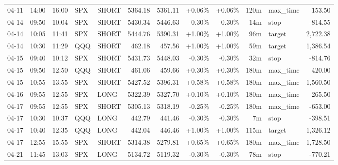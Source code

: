 \documentclass[11pt,a4paper]{article}
\begin{document}
\begin{center}
\begin{longtable}{>{\color{txtmain}}l l l l l r r r r r >{\color{txtmain}}l r}
04-11 & 14:00 & 16:00 & SPX & SHORT & 5364.18 & 5361.11 & \textcolor{wingreen}{+0.06\%} & \textcolor{wingreen}{+0.06\%} & 120m & max\_time & \textcolor{wingreen}{153.50} \\
04-14 & 09:50 & 10:04 & SPX & SHORT & 5430.34 & 5446.63 & \textcolor{lossred}{-0.30\%} & \textcolor{lossred}{-0.30\%} & 14m & stop & \textcolor{lossred}{-814.55} \\
04-14 & 10:05 & 11:41 & SPX & SHORT & 5444.76 & 5390.31 & \textcolor{wingreen}{+1.00\%} & \textcolor{wingreen}{+1.00\%} & 96m & target & \textcolor{wingreen}{2,722.38} \\
04-14 & 10:30 & 11:29 & QQQ & SHORT & 462.18 & 457.56 & \textcolor{wingreen}{+1.00\%} & \textcolor{wingreen}{+1.00\%} & 59m & target & \textcolor{wingreen}{1,386.54} \\
04-15 & 09:40 & 10:12 & SPX & SHORT & 5431.73 & 5448.03 & \textcolor{lossred}{-0.30\%} & \textcolor{lossred}{-0.30\%} & 32m & stop & \textcolor{lossred}{-814.76} \\
04-15 & 09:50 & 12:50 & QQQ & SHORT & 461.06 & 459.66 & \textcolor{wingreen}{+0.30\%} & \textcolor{wingreen}{+0.30\%} & 180m & max\_time & \textcolor{wingreen}{420.00} \\
04-15 & 10:55 & 13:55 & SPX & SHORT & 5427.52 & 5396.31 & \textcolor{wingreen}{+0.58\%} & \textcolor{wingreen}{+0.58\%} & 180m & max\_time & \textcolor{wingreen}{1,560.50} \\
04-16 & 09:55 & 12:55 & SPX & LONG & 5322.39 & 5327.70 & \textcolor{wingreen}{+0.10\%} & \textcolor{wingreen}{+0.10\%} & 180m & max\_time & \textcolor{wingreen}{265.50} \\
04-17 & 09:55 & 12:55 & SPX & SHORT & 5305.13 & 5318.19 & \textcolor{lossred}{-0.25\%} & \textcolor{lossred}{-0.25\%} & 180m & max\_time & \textcolor{lossred}{-653.00} \\
04-17 & 10:30 & 10:37 & QQQ & LONG & 442.79 & 441.46 & \textcolor{lossred}{-0.30\%} & \textcolor{lossred}{-0.30\%} & 7m & stop & \textcolor{lossred}{-398.51} \\
04-17 & 10:40 & 12:35 & QQQ & LONG & 442.04 & 446.46 & \textcolor{wingreen}{+1.00\%} & \textcolor{wingreen}{+1.00\%} & 115m & target & \textcolor{wingreen}{1,326.12} \\
04-17 & 12:55 & 15:55 & SPX & SHORT & 5314.38 & 5279.81 & \textcolor{wingreen}{+0.65\%} & \textcolor{wingreen}{+0.65\%} & 180m & max\_time & \textcolor{wingreen}{1,728.50} \\
04-21 & 11:45 & 13:03 & SPX & LONG & 5134.72 & 5119.32 & \textcolor{lossred}{-0.30\%} & \textcolor{lossred}{-0.30\%} & 78m & stop & \textcolor{lossred}{-770.21} \\

\end{longtable}
\end{center}
\end{document}
